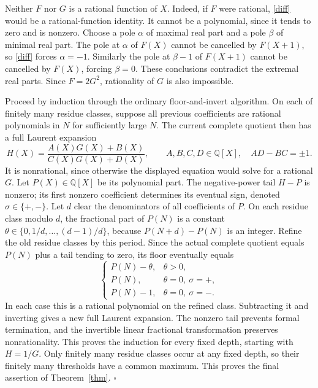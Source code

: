 \documentclass[11pt]{article}
\newcommand{\Q}{\mathbb Q}
\begin{document}
Neither $F$ nor $G$ is a rational function of $X$.
Indeed, if $F$ were rational, \eqref{diff} would be a rational-function
identity. It cannot be a polynomial, since it tends to zero and is
nonzero. Choose a pole $\alpha$ of maximal real part and a pole $\beta$
of minimal real part. The pole at $\alpha$ of $F(X)$ cannot be
cancelled by $F(X+1)$, so \eqref{diff} forces $\alpha=-1$.
Similarly the pole at $\beta-1$ of $F(X+1)$ cannot be cancelled by
$F(X)$, forcing $\beta=0$. These conclusions contradict the extremal
real parts. Since $F=2G^2$, rationality of $G$ is also impossible.

Proceed by induction through the ordinary floor-and-invert algorithm.
On each of finitely many residue classes, suppose all previous
coefficients are rational polynomials in $N$ for sufficiently large $N$.
The current complete quotient then has a full Laurent expansion
\[
 H(X)=\frac{A(X)G(X)+B(X)}{C(X)G(X)+D(X)},
 \qquad A,B,C,D\in\Q[X],\quad AD-BC=\pm1.
\]
It is nonrational, since otherwise the displayed equation would solve
for a rational $G$. Let $P(X)\in\Q[X]$ be its polynomial part.
The negative-power tail $H-P$ is nonzero; its first nonzero coefficient
determines its eventual sign, denoted $\sigma\in\{+,-\}$.
Let $d$ clear the denominators of all coefficients of $P$.
On each residue class modulo $d$, the fractional part of $P(N)$ is a
constant $\theta\in\{0,1/d,\ldots,(d-1)/d\}$, because
$P(N+d)-P(N)$ is an integer.
Refine the old residue classes by this period. Since the actual
complete quotient equals $P(N)$ plus a tail tending to zero,
its floor eventually equals
\[
 \begin{cases}
 P(N)-\theta,&\theta>0,\\
 P(N),&\theta=0,\ \sigma=+,\\
 P(N)-1,&\theta=0,\ \sigma=-.
 \end{cases}
\]
In each case this is a rational polynomial on the refined class.
Subtracting it and inverting gives a new full Laurent expansion.
The nonzero tail prevents formal termination, and the invertible
linear fractional transformation preserves nonrationality.
This proves the induction for every fixed depth, starting with
$H=1/G$. Only finitely many residue classes occur at any fixed depth,
so their finitely many thresholds have a common maximum.
This proves the final assertion of Theorem~\ref{thm}.
\hfill$\square$
\end{document}

